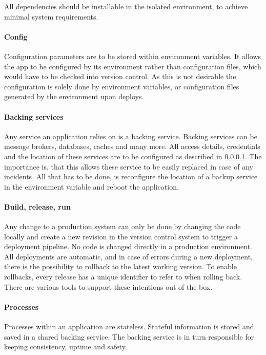 All dependencies should be installable in the isolated environment, to achieve
minimal system requirements.

\paragraph{Config}
\label{para:12factor:config}

Configuration parameters are to be stored within environment variables. It
allows the app to be configured by its environment rather than configuration
files, which would have to be checked into version control. As this is not
desirable the configuration is solely done by environment variables, or
configuration files generated by the environment upon deploys.

\paragraph{Backing services}

Any service an application relies on is a backing service. Backing services can
be message brokers, databases, caches and many more. All access details,
credentials and the location of these services are to be configured as
described in \ref{para:12factor:config}. The importance is, that this allows
these service to be easily replaced in case of any incidents. All that has to
be done, is reconfigure the location of a backup service in the environment
variable and reboot the application.

\paragraph{Build, release, run}

Any change to a production system can only be done by changing the code locally
and create a new revision in the version control system to trigger a deployment
pipeline. No code is changed directly in a production environment. All
deployments are automatic, and in case of errors during a new deployment, there
is the possibility to rollback to the latest working version. To enable
rollbacks, every release has a unique identifier to refer to when rolling back.
There are various tools to support these intentions out of the box.

\paragraph{Processes}

Processes within an application are stateless. Stateful information is stored
and saved in a shared backing service. The backing service is in turn
responsible for keeping consistency, uptime and safety.

